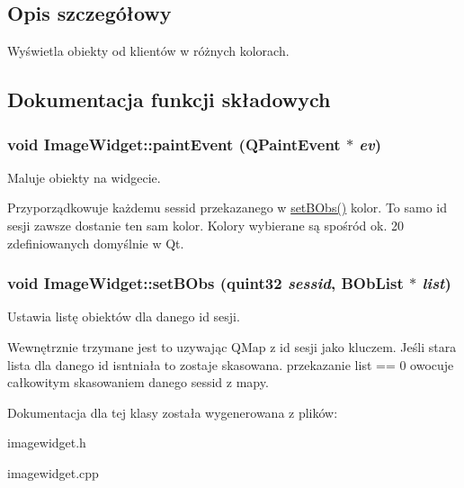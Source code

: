 \subsection{Opis szczegółowy}
Wyświetla obiekty od klientów w różnych kolorach. 

\subsection{Dokumentacja funkcji składowych}
\hypertarget{class_image_widget_aea7cb36d8900749ab60d1e097fa1adfb}{
\subsubsection[{paintEvent}]{\setlength{\rightskip}{0pt plus 5cm}void ImageWidget::paintEvent (QPaintEvent $\ast$ {\em ev})}}
\label{class_image_widget_aea7cb36d8900749ab60d1e097fa1adfb}


Maluje obiekty na widgecie. 

Przyporządkowuje każdemu sessid przekazanego w \hyperlink{class_image_widget_aa86269777fd7075bc223a5c8e011252b}{setBObs()} kolor. To samo id sesji zawsze dostanie ten sam kolor. Kolory wybierane są spośród ok. 20 zdefiniowanych domyślnie w Qt. \hypertarget{class_image_widget_aa86269777fd7075bc223a5c8e011252b}{
\subsubsection[{setBObs}]{\setlength{\rightskip}{0pt plus 5cm}void ImageWidget::setBObs (quint32 {\em sessid}, \/  BObList $\ast$ {\em list})}}
\label{class_image_widget_aa86269777fd7075bc223a5c8e011252b}


Ustawia listę obiektów dla danego id sesji. 

Wewnętrznie trzymane jest to uzywając QMap z id sesji jako kluczem. Jeśli stara lista dla danego id isntniała to zostaje skasowana. przekazanie list == 0 owocuje całkowitym skasowaniem danego sessid z mapy. 

Dokumentacja dla tej klasy została wygenerowana z plików:\begin{DoxyCompactItemize}
\item 
imagewidget.h\item 
imagewidget.cpp\end{DoxyCompactItemize}
